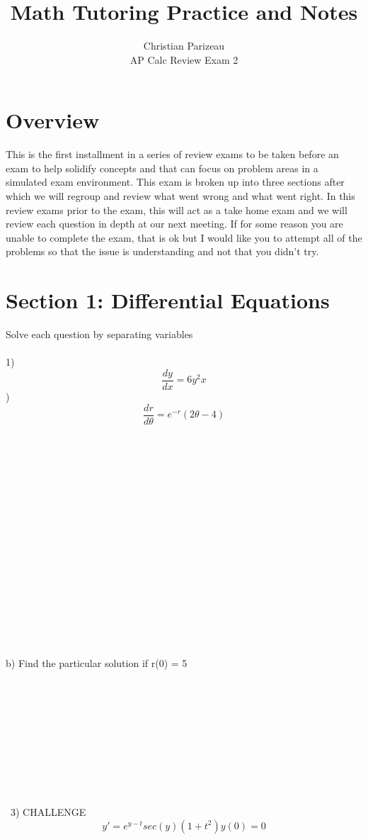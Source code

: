\documentclass[12pt]{article}
\begin{document}
 
 
 
\title{Math Tutoring Practice and Notes}%
\author{Christian Parizeau\\ %
AP Calc Review Exam 2} %
 
\maketitle
\section{Overview}
This is the first installment in a series of review exams to be taken before an exam to help solidify concepts and that can focus on problem areas in a simulated exam environment. This exam is broken up into three sections after which we will regroup and review what went wrong and what went right. In this review exams prior to the exam, this will act as a take home exam and we will review each question in depth at our next meeting. If for some reason you are unable to complete the exam, that is ok but I would like you to attempt all of the problems so that the issue is understanding and not that you didn't try.  

\section{Section 1: Differential Equations}
Solve each question by separating variables \\\\
1)$$ \frac{dy}{dx} = 6y^2x $$
)$$\frac{dr}{d\theta} = e^{-r}(2\theta - 4) $$
\\\\\\\\\\\\\\\\\\\\\\\\\\\\\\\
\begin{centering}b) Find the particular solution if r(0) = 5\end{centering}\\\\\\\\\\\\\\\\\\\
3) CHALLENGE$$y' = e^{y-t}sec(y)(1+t^2) y(0)= 0 $$
\newpage
\end{document}

